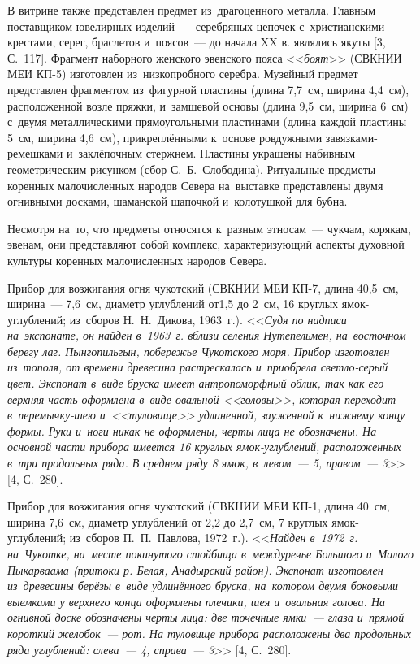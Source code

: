 В витрине также представлен предмет из~драгоценного металла. Главным поставщиком ювелирных изделий~--- серебряных цепочек с~христианскими крестами, серег, браслетов и~поясов~--- до начала XX в. являлись якуты [3, С.~117]. Фрагмент наборного женского эвенского пояса <<\textit{боят}>> (СВКНИИ МЕИ КП-5) изготовлен из~низкопробного серебра. Музейный предмет представлен фрагментом из~фигурной пластины (длина 7,7~см, ширина 4,4~см), расположенной возле пряжки, и~замшевой основы (длина 9,5~см, ширина 6~см) с~двумя металлическими прямоугольными пластинами (длина каждой пластины 5~см, ширина 4,6~см), прикреплёнными к~основе ровдужными завязками-ремешками и~заклёпочным стержнем. Пластины украшены набивным геометрическим рисунком (сбор \enlargethispage{2\baselineskip}С.~Б.~Слободина).
\clearpage
Ритуальные предметы коренных малочисленных народов Севера на~выставке представлены двумя огнивными досками, шаманской шапочкой и~колотушкой для бубна.

Несмотря на~то, что предметы относятся к~разным этносам~--- чукчам, корякам, эвенам, они представляют собой комплекс, характеризующий аспекты духовной культуры коренных малочисленных народов Севера.

Прибор для возжигания огня чукотский (СВКНИИ МЕИ КП-7, длина 40,5~см, ширина~--- 7,6~см, диаметр углублений от1,5 до 2~см, 16 круглых ямок-углублений; из~сборов Н.~Н.~Дикова, 1963~г.). <<\textit{Судя по надписи на~экспонате, он найден в~1963~г. вблизи селения Нутепельмен, на~восточном берегу лаг. Пынгопильгын, побережье Чукотского моря. Прибор изготовлен из~тополя, от времени древесина растрескалась и~приобрела светло-серый цвет. Экспонат в~виде бруска имеет антропоморфный облик, так как его верхняя часть оформлена в~виде овальной <<\textit{головы}>>, которая переходит в~перемычку-шею и~<<\textit{туловище}>> удлиненной, зауженной к~нижнему концу формы. Руки и~ноги никак не оформлены, черты лица не обозначены. На основной части прибора имеется 16 круглых ямок-углублений, расположенных в~три продольных ряда. В среднем ряду 8 ямок, в~левом~--- 5, правом~--- 3}>> [4, С.~280].

Прибор для возжигания огня чукотский (СВКНИИ МЕИ КП-1, длина 40~см, ширина 7,6~см, диаметр углублений от 2,2 до 2,7~см, 7 круглых ямок-углублений; из~сборов П.~П.~Павлова, 1972~г.). <<\textit{Найден в~1972~г. на~Чукотке, на~месте покинутого стойбища в~междуречье Большого и~Малого Пыкарваама (притоки р. Белая, Анадырский район). Экспонат изготовлен из~древесины берёзы в~виде удлинённого бруска, на~котором двумя боковыми выемками у верхнего конца оформлены плечики, шея и~овальная голова. На огнивной доске обозначены черты лица: две точечные ямки~--- глаза и~прямой короткий желобок~--- рот. На туловище прибора расположены два продольных ряда углублений: слева~--- 4, справа~--- 3}>> [4, С.~280].

